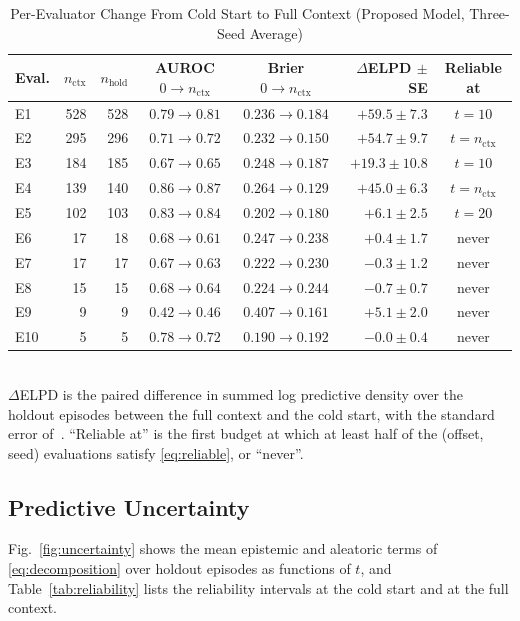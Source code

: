 \documentclass[lettersize,journal]{IEEEtran}
\begin{document}
\begin{table}[t]
\caption{Per-Evaluator Change From Cold Start to Full Context (Proposed Model, Three-Seed Average)}
\label{tab:per-evaluator}
\centering
\setlength{\tabcolsep}{3pt}
\begin{tabular}{lrrccrc}
\toprule
Eval. & $n_{\mathrm{ctx}}$ & $n_{\mathrm{hold}}$ & AUROC $0\!\to\!n_{\mathrm{ctx}}$ & Brier $0\!\to\!n_{\mathrm{ctx}}$ & $\Delta$ELPD $\pm$ SE & Reliable at \\
\midrule
E1  & 528 & 528 & $0.79\to0.81$ & $0.236\to0.184$ & $+59.5\pm7.3$  & $t=10$ \\
E2  & 295 & 296 & $0.71\to0.72$ & $0.232\to0.150$ & $+54.7\pm9.7$  & $t=n_{\mathrm{ctx}}$ \\
E3  & 184 & 185 & $0.67\to0.65$ & $0.248\to0.187$ & $+19.3\pm10.8$ & $t=10$ \\
E4  & 139 & 140 & $0.86\to0.87$ & $0.264\to0.129$ & $+45.0\pm6.3$  & $t=n_{\mathrm{ctx}}$ \\
E5  & 102 & 103 & $0.83\to0.84$ & $0.202\to0.180$ & $+6.1\pm2.5$   & $t=20$ \\
E6  &  17 &  18 & $0.68\to0.61$ & $0.247\to0.238$ & $+0.4\pm1.7$   & never \\
E7  &  17 &  17 & $0.67\to0.63$ & $0.222\to0.230$ & $-0.3\pm1.2$   & never \\
E8  &  15 &  15 & $0.68\to0.64$ & $0.224\to0.244$ & $-0.7\pm0.7$   & never \\
E9  &   9 &   9 & $0.42\to0.46$ & $0.407\to0.161$ & $+5.1\pm2.0$   & never \\
E10 &   5 &   5 & $0.78\to0.72$ & $0.190\to0.192$ & $-0.0\pm0.4$   & never \\
\bottomrule
\end{tabular}
\\[2pt]
{\footnotesize $\Delta$ELPD is the paired difference in summed log predictive density over the holdout episodes between the full context and the cold start, with the standard error of~\cite{vehtari2017loo}. ``Reliable at'' is the first budget at which at least half of the (offset, seed) evaluations satisfy \eqref{eq:reliable}, or ``never''.}
\end{table}

\subsection{Predictive Uncertainty}
\label{sec:results-uncertainty}

Fig.~\ref{fig:uncertainty} shows the mean epistemic and aleatoric terms of \eqref{eq:decomposition} over holdout episodes as functions of $t$, and Table~\ref{tab:reliability} lists the reliability intervals at the cold start and at the full context.
\end{document}
